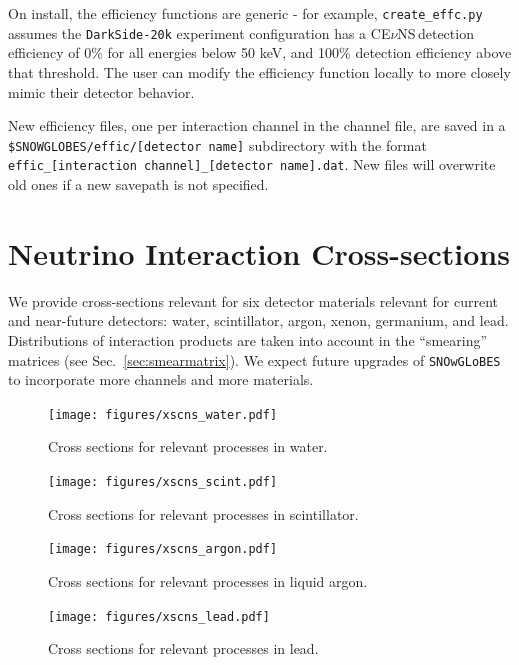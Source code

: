 \documentclass{article}
\newcommand{\cev}{CE$\nu$NS\,}
\newcommand{\snow}{\texttt{SNOwGLoBES}\,}
\begin{document}
On install, the efficiency functions are generic - for example, \texttt{create\_effc.py} assumes the \texttt{DarkSide-20k} experiment configuration has a \cev detection efficiency of 0\% for all energies below 50 keV, and 100\% detection efficiency above that threshold. The user can modify the efficiency function locally to more closely mimic their detector behavior.

New efficiency files, one per interaction channel in the channel file, are saved in a \texttt{\$SNOWGLOBES/effic/[detector name]} subdirectory with the format \texttt{effic\_[interaction channel]\_[detector name].dat}. New files will overwrite old ones if a new savepath is not specified.

\section{Neutrino Interaction Cross-sections}\label{sec:xsecs}
We provide cross-sections relevant for six detector materials relevant for current and near-future detectors: water, scintillator, argon, xenon, germanium, and lead. Distributions of interaction products are taken into account in the ``smearing'' matrices (see Sec.~\ref{sec:smearmatrix}). We expect future upgrades of \snow to incorporate more channels and more materials.

\begin{figure}[htb]
  \centering\texttt{[image: figures/xscns\_water.pdf]}
  \caption{Cross sections for relevant processes in water.}
  \label{fig:water_xscns}
\end{figure}

\begin{figure}[htb]
  \centering\texttt{[image: figures/xscns\_scint.pdf]}
  \caption{Cross sections for relevant processes in scintillator.}
  \label{fig:scint_xscns}
\end{figure}


\begin{figure}[htb]
  \centering\texttt{[image: figures/xscns\_argon.pdf]}
  \caption{Cross sections for relevant processes in liquid argon.}
  \label{fig:argon_xscns}
\end{figure}

\begin{figure}[htb]
  \centering\texttt{[image: figures/xscns\_lead.pdf]}
  \caption{Cross sections for relevant processes in lead.}
  \label{fig:lead_xscns}
\end{figure}
\end{document}

